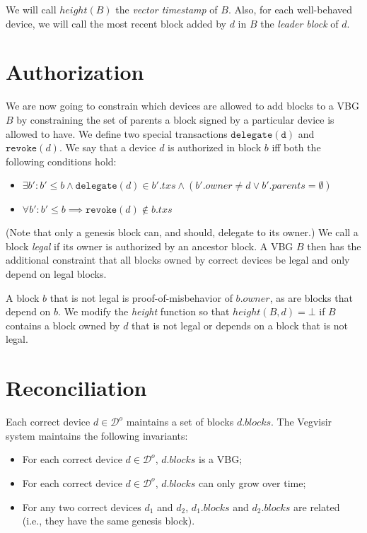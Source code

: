 \documentclass{article}
\begin{document}
We will call $\mathit{height}(B)$ the \emph{vector timestamp} of $B$.
Also, for each well-behaved device, we will call the most recent block added by $d$ in $B$ the
\emph{leader block} of $d$.

\section*{Authorization}

We are now going to constrain which devices are allowed to add blocks to a VBG $B$ by constraining
the set of parents a block signed by a particular device is allowed to have.
We define two special transactions $\mathtt{delegate(d)}$ and $\mathtt{revoke}(d)$.
We say that a device $d$ is authorized in block $b$ iff both the following
conditions hold:
\begin{itemize}
\item $\exists b': b' \leq b \wedge \mathtt{delegate}(d) \in b'.\mathit{txs} \wedge (b'.\mathit{owner} \ne d \vee b'.\mathit{parents} = \emptyset)$
\item $\forall b': b' \leq b \implies \mathtt{revoke}(d) \notin b.\mathit{txs}$
\end{itemize}
(Note that only a genesis block can, and should, delegate to its owner.)
We call a block \emph{legal} if its owner is authorized by an ancestor block.
A VBG $B$ then has the additional constraint that all blocks owned by correct devices be legal and
only depend on legal blocks.

A block $b$ that is not legal is proof-of-misbehavior of $b.\mathit{owner}$,
as are blocks that depend on $b$.
We modify the \textit{height} function so
that $\mathit{height}(B, d) = \bot$ if $B$ contains a block owned by $d$ that is not legal
or depends on a block that is not legal.

\section*{Reconciliation}

Each correct device $d \in \mathcal{D}^o$ maintains a set of blocks $d.\mathit{blocks}$.
The Vegvisir system maintains the following invariants:

\begin{itemize}
\item For each correct device $d \in \mathcal{D}^o$, $d.\mathit{blocks}$ is a VBG;
\item For each correct device $d \in \mathcal{D}^o$, $d.\mathit{blocks}$ can only grow over time;
\item For any two correct devices $d_1$ and $d_2$, $d_1.\mathit{blocks}$ and $d_2.\mathit{blocks}$ are related (i.e., they have the same genesis block).
\end{itemize}
\end{document}
